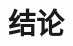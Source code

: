 \documentclass[12pt, a4paper, oneside]{ctexart}
\begin{document}
\begin{spacing}{2.0}
\subsection{}
\subsection{}
\subsection{}


\section{结论}



\end{spacing}{}
\end{document}
